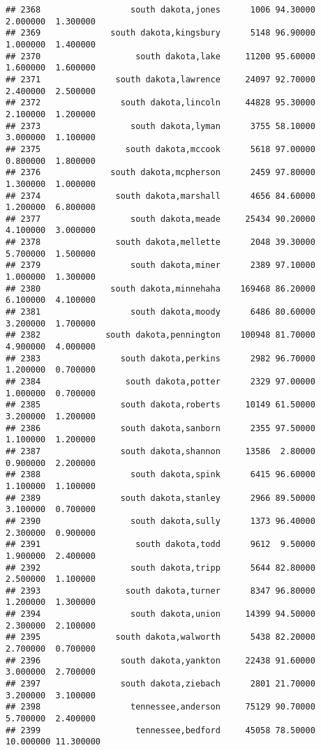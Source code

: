 \documentclass[
]{article}
\begin{document}
\begin{verbatim}
## 2368                  south dakota,jones      1006 94.30000  2.000000  1.300000
## 2369              south dakota,kingsbury      5148 96.90000  1.000000  1.400000
## 2370                   south dakota,lake     11200 95.60000  1.600000  1.600000
## 2371               south dakota,lawrence     24097 92.70000  2.400000  2.500000
## 2372                south dakota,lincoln     44828 95.30000  2.100000  1.200000
## 2373                  south dakota,lyman      3755 58.10000  3.000000  1.100000
## 2375                 south dakota,mccook      5618 97.00000  0.800000  1.800000
## 2376              south dakota,mcpherson      2459 97.80000  1.300000  1.000000
## 2374               south dakota,marshall      4656 84.60000  1.200000  6.800000
## 2377                  south dakota,meade     25434 90.20000  4.100000  3.000000
## 2378               south dakota,mellette      2048 39.30000  5.700000  1.500000
## 2379                  south dakota,miner      2389 97.10000  1.000000  1.300000
## 2380              south dakota,minnehaha    169468 86.20000  6.100000  4.100000
## 2381                  south dakota,moody      6486 80.60000  3.200000  1.700000
## 2382             south dakota,pennington    100948 81.70000  4.900000  4.000000
## 2383                south dakota,perkins      2982 96.70000  1.200000  0.700000
## 2384                 south dakota,potter      2329 97.00000  1.000000  0.700000
## 2385                south dakota,roberts     10149 61.50000  3.200000  1.200000
## 2386                south dakota,sanborn      2355 97.50000  1.100000  1.200000
## 2387                south dakota,shannon     13586  2.80000  0.900000  2.200000
## 2388                  south dakota,spink      6415 96.60000  1.100000  1.100000
## 2389                south dakota,stanley      2966 89.50000  3.100000  0.700000
## 2390                  south dakota,sully      1373 96.40000  2.300000  0.900000
## 2391                   south dakota,todd      9612  9.50000  1.900000  2.400000
## 2392                  south dakota,tripp      5644 82.80000  2.500000  1.100000
## 2393                 south dakota,turner      8347 96.80000  1.200000  1.300000
## 2394                  south dakota,union     14399 94.50000  2.300000  2.100000
## 2395               south dakota,walworth      5438 82.20000  2.700000  0.700000
## 2396                south dakota,yankton     22438 91.60000  3.000000  2.700000
## 2397                south dakota,ziebach      2801 21.70000  3.200000  3.100000
## 2398                  tennessee,anderson     75129 90.70000  5.700000  2.400000
## 2399                   tennessee,bedford     45058 78.50000 10.000000 11.300000

\end{verbatim}
\end{document}
